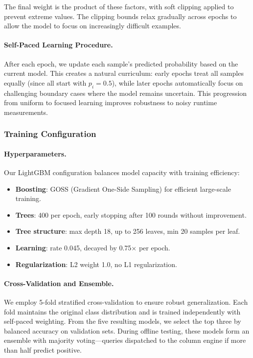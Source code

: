 \documentclass[sigconf, nonacm]{acmart}
\begin{document}
The final weight is the product of these factors, with soft clipping applied to prevent extreme values. The clipping bounds relax gradually across epochs to allow the model to focus on increasingly difficult examples.

\paragraph{Self-Paced Learning Procedure.}
After each epoch, we update each sample's predicted probability based on the current model. This creates a natural curriculum: early epochs treat all samples equally (since all start with $p_i = 0.5$), while later epochs automatically focus on challenging boundary cases where the model remains uncertain. This progression from uniform to focused learning improves robustness to noisy runtime measurements.

\subsubsection{Training Configuration}

\paragraph{Hyperparameters.}
Our LightGBM configuration balances model capacity with training efficiency:
\begin{itemize}[leftmargin=*,topsep=2pt,itemsep=1pt]
\item \textbf{Boosting}: GOSS (Gradient One-Side Sampling) for efficient large-scale training.
\item \textbf{Trees}: 400 per epoch, early stopping after 100 rounds without improvement.
\item \textbf{Tree structure}: max depth 18, up to 256 leaves, min 20 samples per leaf.
\item \textbf{Learning}: rate 0.045, decayed by 0.75× per epoch.
\item \textbf{Regularization}: L2 weight 1.0, no L1 regularization.
\end{itemize}

\paragraph{Cross-Validation and Ensemble.}
We employ 5-fold stratified cross-validation to ensure robust generalization. Each fold maintains the original class distribution and is trained independently with self-paced weighting. From the five resulting models, we select the top three by balanced accuracy on validation sets. During offline testing, these models form an ensemble with majority voting—queries dispatched to the column engine if more than half predict positive.
\end{document}
